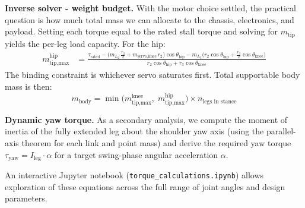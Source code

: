 \textbf{Inverse solver - weight budget.}
With the motor choice settled, the practical question is how much total mass we can allocate to the chassis, electronics, and payload.
Setting each torque equal to the rated stall torque and solving for $m_{\text{tip}}$ yields the per-leg load capacity.
For the hip:
%
\begin{align*}
  m_{\text{tip,max}}^{\text{hip}}
  &= \frac{
    \tau_{\text{rated}}
    - \bigl(m_{L_2}\,\tfrac{r_2}{2}
    + m_{\text{servo,knee}}\,r_2\bigr)\cos\theta_{\text{hip}}
    - m_{L_3}\bigl(r_2\cos\theta_{\text{hip}}
    + \tfrac{r_3}{2}\cos\theta_{\text{knee}}\bigr)
  }{
    r_2\cos\theta_{\text{hip}} + r_3\cos\theta_{\text{knee}}
  }
\end{align*}
%
The binding constraint is whichever servo saturates first.  
Total supportable body mass is then:
%
\[
  m_{\text{body}}
  = \min\!\bigl(m_{\text{tip,max}}^{\text{knee}},\;
  m_{\text{tip,max}}^{\text{hip}}\bigr)
  \times n_{\text{legs in stance}}
\]

\vspace{0.5cm}
\textbf{Dynamic yaw torque.}
As a secondary analysis, we compute the moment of inertia of the fully extended leg about the shoulder yaw axis (using the parallel-axis theorem for each link and point mass) and derive the required yaw torque $\tau_{\text{yaw}} = I_{\text{leg}} \cdot \alpha$ for a target swing-phase angular acceleration $\alpha$.

\vspace{0.5cm}
An interactive Jupyter notebook (\texttt{torque\_calculations.ipynb}) allows exploration of these equations across the full range of joint angles and design parameters.

